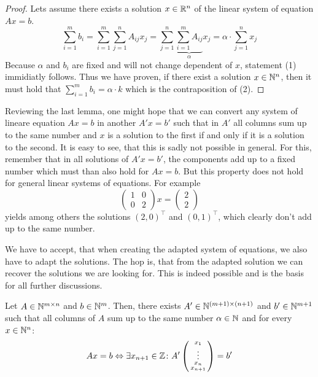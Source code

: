 \begin{proof}
    Lets assume there exists a solution $x \in \mathbb{R}^n$ of the linear system of equation $Ax=b$.
    $$\sum_{i=1}^m b_i = \sum_{i=1}^{m}\sum_{j=1}^{n}A_{ij} x_j = \sum_{j=1}^{n}\underbrace{\sum_{i=1}^{m}A_{ij}}_\alpha x_j = \alpha \cdot \sum_{j=1}^{n}x_j$$
    Because $\alpha$ and $b_i$ are fixed and will not change dependent of $x$, statement (1) immidiatly follows. Thus we have proven, if there exist a solution $x \in \mathbb{N}^n$, then it must hold that $\sum_{i=1}^{m}b_i = \alpha \cdot k$ which is the contraposition of (2).
\end{proof}
Reviewing the last lemma, one might hope that we can convert any system of lineare equation $Ax = b$ in another $A'x = b'$ such that in $A'$ all columns sum up to the same number and $x$ is a solution to the first if and only if it is a solution to the second. It is easy to see, that this is sadly not possible in general. For this, remember that in all solutions of $A'x=b'$, the components add up to a fixed number which must than also hold for $Ax=b$. But this property does not hold for general linear systems of equations. For example
$$
\left(\begin{matrix}
    1 & 0\\
    0 & 2
\end{matrix}\right)
x = \left(\begin{matrix}
    2\\2
\end{matrix}\right)
$$
yields among others the solutions $(2, 0)^\top$ and $(0, 1)^\top$, which clearly don't add up to the same number. 

We have to accept, that when creating the adapted system of equations, we also have to adapt the solutions. The hop is, that from the adapted solution we can recover the solutions we are looking for. This is indeed possible and is the basis for all further discussions.

\begin{theorem}
    Let $A\in \mathbb{N}^{m \times n}$ and $b \in \mathbb{N}^m$. Then, there exists $A' \in \mathbb{N}^{(m+1) \times (n+1)}$ and $b' \in \mathbb{N}^{m+1}$ such that all columns of $A$ sum up to the same number $\alpha \in \mathbb{N}$ and for every $x \in \mathbb{N}^n$:
    $$Ax = b \Leftrightarrow \exists x_{n+1}\in \mathbb{Z}\colon A' \left(\begin{smallmatrix}
        x_1\\
        \vdots\\
        x_n\\
        x_{n+1}
    \end{smallmatrix}\right) = b'$$
\end{theorem}

